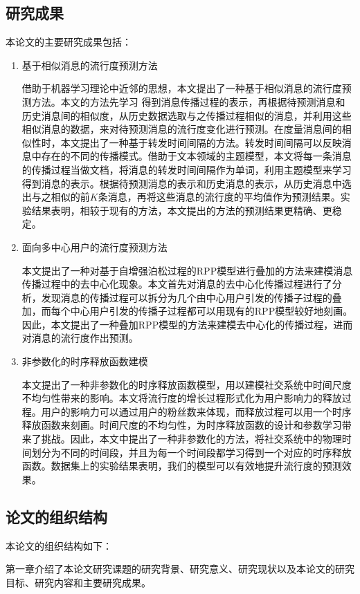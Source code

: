 \subsection{研究成果}
本论文的主要研究成果包括：
\begin{enumerate}
\item 基于相似消息的流行度预测方法

借助于机器学习理论中近邻的思想，本文提出了一种基于相似消息的流行度预测方法。本文的方法先学习 得到消息传播过程的表示，再根据待预测消息和历史消息间的相似度，从历史数据选取与之传播过程相似的消息，并利用这些相似消息的数据，来对待预测消息的流行度变化进行预测。在度量消息间的相似性时，本文提出了一种基于转发时间间隔的方法。转发时间间隔可以反映消息中存在的不同的传播模式。借助于文本领域的主题模型，本文将每一条消息的传播过程当做文档，将消息的转发时间间隔作为单词，利用主题模型来学习得到消息的表示。根据待预测消息的表示和历史消息的表示，从历史消息中选出与之相似的前$K$条消息，再将这些消息的流行度的平均值作为预测结果。实验结果表明，相较于现有的方法，本文提出的方法的预测结果更精确、更稳定。
\item 面向多中心用户的流行度预测方法

本文提出了一种对基于自增强泊松过程的RPP模型\citep{shen2014modeling}进行叠加的方法来建模消息传播过程中的去中心化现象。本文首先对消息的去中心化传播过程进行了分析，发现消息的传播过程可以拆分为几个由中心用户引发的传播子过程的叠加，而每个中心用户引发的传播子过程都可以用现有的RPP模型较好地刻画。因此，本文提出了一种叠加RPP模型的方法来建模去中心化的传播过程，进而对消息的流行度作出预测。
\item 非参数化的时序释放函数建模

本文提出了一种非参数化的时序释放函数模型，用以建模社交系统中时间尺度不均匀性带来的影响。本文将流行度的增长过程形式化为用户影响力的释放过程。用户的影响力可以通过用户的粉丝数来体现，而释放过程可以用一个时序释放函数来刻画。时间尺度的不均匀性，为时序释放函数的设计和参数学习带来了挑战。因此，本文中提出了一种非参数化的方法，将社交系统中的物理时间划分为不同的时间段，并且为每一个时间段都学习得到一个对应的时序释放函数。数据集上的实验结果表明，我们的模型可以有效地提升流行度的预测效果。
\end{enumerate}
\subsection{论文的组织结构}
本论文的组织结构如下：

第一章介绍了本论文研究课题的研究背景、研究意义、研究现状以及本论文的研究目标、研究内容和主要研究成果。

